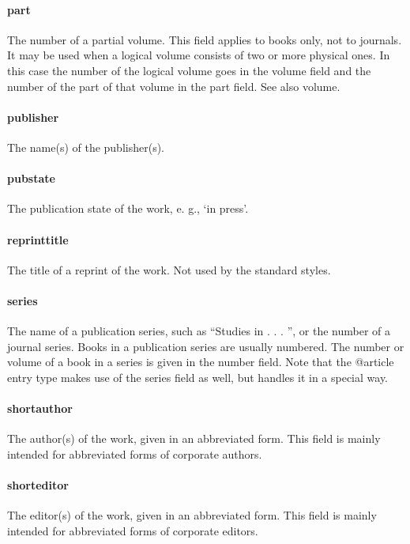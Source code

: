 \documentclass[a4paper,12pt]{report}
\begin{document}
\paragraph{part}
The number of a partial volume. This field applies to books only, not to journals. It may be
used when a logical volume consists of two or more physical ones. In this case the number
of the logical volume goes in the volume field and the number of the part of that volume in
the part field. See also volume.

\paragraph{publisher}
The name(s) of the publisher(s).

\paragraph{pubstate}
The publication state of the work, e. g., ‘in press’.

\paragraph{reprinttitle}
The title of a reprint of the work. Not used by the standard styles.

\paragraph{series}
The name of a publication series, such as “Studies in . . . ”, or the number of a journal series.
Books in a publication series are usually numbered. The number or volume of a book in
a series is given in the number field. Note that the @article entry type makes use of the
series field as well, but handles it in a special way.

\paragraph{shortauthor}
The author(s) of the work, given in an abbreviated form. This field is mainly intended for
abbreviated forms of corporate authors.

\paragraph{shorteditor}
The editor(s) of the work, given in an abbreviated form. This field is mainly intended for
abbreviated forms of corporate editors.
\end{document}
